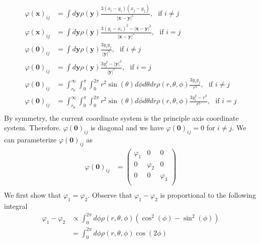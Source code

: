\documentclass[]{book}
\begin{document}
\begin{enumerate}[1)]
\begin{enumerate}[a)]
\begin{equation}
\begin{split}
\varphi(\textbf{x})_{ij} & = \int d\textbf{y} \rho(\textbf{y})\frac{3(x_i-y_i)(x_j-y_j)}{|\textbf{x} - \textbf{y}|^5 }, \text{	} \text{if $i\ne j$} \\
\varphi(\textbf{x})_{ij} & = \int d\textbf{y} \rho(\textbf{y})\frac{3(y_i-x_i)^2 - |\textbf{x} - \textbf{y}|^2}{|\textbf{x} - \textbf{y}|^5 }, \text{	} \text{if $i =  j$}   \\
\varphi(\textbf{0})_{ij} & = \int d\textbf{y} \rho(\textbf{y})\frac{3y_iy_j}{| \textbf{y}|^5 }, \text{	} \text{if $i\ne j$} \\
\varphi(\textbf{0})_{ij} & = \int d\textbf{y} \rho(\textbf{y})\frac{3y_i^2 - |\textbf{y}|^2}{| \textbf{y}|^5 }, \text{	} \text{if $i =  j$}   \\
\varphi(\textbf{0})_{ij} & = \int_{r_0}^{\infty}\int_{0}^{\pi}\int_{0}^{2\pi} r^2\sin(\theta) d\phi d\theta dr \rho(r,\theta, \phi)\frac{3y_iy_j}{ r^5 }, \text{	} \text{if $i\ne j$} \\
\varphi(\textbf{0})_{ij} & = \int_{r_0}^{\infty}\int_{0}^{\pi}\int_{0}^{2\pi} r^2\sin(\theta) d\phi d\theta dr \rho(r,\theta, \phi)\frac{3y_i^2 - r^2}{ r^5 }, \text{	} \text{if $i =  j$} \\
\end{split}
\end{equation}
By symmetry, the current coordinate system is the principle axis coordinate system. Therefore. $\varphi(\textbf{0})_{ij}$ is diagonal and we have $\varphi(\textbf{0})_{ij} = 0$ for $i \ne j$. We can parameterize $\varphi(\textbf{0})_{ij}$ as
\begin{equation}
\begin{split}
\varphi(\textbf{0})_{ij} & = \left(
\begin{array}{ccc}
   \varphi_1 & 0 & 0 \\
 0 &  \varphi_2 & 0 \\
 0 & 0 &  
   \varphi_3\\
\end{array}
\right)\\
\end{split}
\end{equation}
We first show that $\varphi_1 = \varphi_2$. Observe that $\varphi_1 - \varphi_2$ is proportional to the following integral
\begin{equation}
\begin{split}
\varphi_1 - \varphi_2 & \propto \int_{0}^{2\pi} d\phi \rho(r, \theta, \phi) (\cos^2(\phi) - \sin^2(\phi) ) \\
& = \int_{0}^{2\pi} d\phi \rho(r, \theta, \phi) \cos(2\phi) \\

\end{split}
\end{equation}
\end{enumerate}
\end{enumerate}
\end{document}
